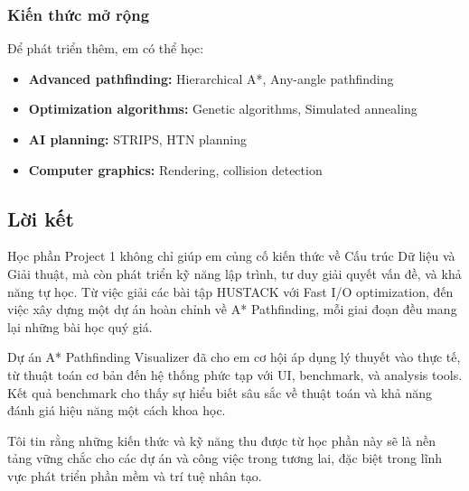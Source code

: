 \documentclass[12pt,a4paper]{article}
\begin{document}
\subsubsection{Kiến thức mở rộng}
Để phát triển thêm, em có thể học:
\begin{itemize}
    \item \textbf{Advanced pathfinding:} Hierarchical A*, Any-angle pathfinding
    \item \textbf{Optimization algorithms:} Genetic algorithms, Simulated annealing
    \item \textbf{AI planning:} STRIPS, HTN planning
    \item \textbf{Computer graphics:} Rendering, collision detection
\end{itemize}

\subsection{Lời kết}
Học phần Project 1 không chỉ giúp em củng cố kiến thức về Cấu trúc Dữ liệu và Giải thuật, mà còn phát triển kỹ năng lập trình, tư duy giải quyết vấn đề, và khả năng tự học. Từ việc giải các bài tập HUSTACK với Fast I/O optimization, đến việc xây dựng một dự án hoàn chỉnh về A* Pathfinding, mỗi giai đoạn đều mang lại những bài học quý giá.

Dự án A* Pathfinding Visualizer đã cho em cơ hội áp dụng lý thuyết vào thực tế, từ thuật toán cơ bản đến hệ thống phức tạp với UI, benchmark, và analysis tools. Kết quả benchmark cho thấy sự hiểu biết sâu sắc về thuật toán và khả năng đánh giá hiệu năng một cách khoa học.

Tôi tin rằng những kiến thức và kỹ năng thu được từ học phần này sẽ là nền tảng vững chắc cho các dự án và công việc trong tương lai, đặc biệt trong lĩnh vực phát triển phần mềm và trí tuệ nhân tạo.
\end{document}
